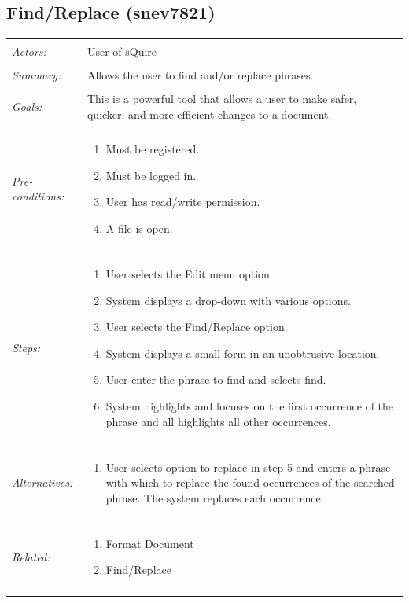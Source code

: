 \documentclass[11pt]{report}
\begin{document}
\subsection{Find/Replace  (snev7821)}
\begin{tabular}{ p{2cm} p{12cm} }
\hline
\\
	\textit{Actors:} & User of sQuire \\
	\\
	\textit{Summary:} &  Allows the user to find and/or replace phrases. \\
	\\
	\textit{Goals:} & This is a powerful tool that allows a user to make safer, quicker, and more efficient changes to a document. \\
	\\
	\textit{Pre-conditions:} &  \begin{enumerate}
		\item Must be registered.
		\item Must be logged in.
		\item User has read/write permission.
		\item A file is open.
	\end{enumerate}\\
	\\
	\textit{Steps:} & \begin{enumerate}
		\item User selects the Edit menu option.
		\item System displays a drop-down with various options.
		\item User selects the Find/Replace option.
		\item System displays a small form in an unobtrusive location.
		\item User enter the phrase to find and selects find.
		\item System highlights and focuses on the first occurrence of the phrase and all highlights all other occurrences.
	\end{enumerate} \\
	\\
	\textit{Alternatives:} & \begin{enumerate}
		\item User selects option to replace in step 5 and enters a phrase with which to replace the found occurrences of the searched phrase. The system replaces each occurrence.
	\end{enumerate} \\
	\\
	\textit{Related:} & \begin{enumerate}
		\item Format Document
		\item Find/Replace
	\end{enumerate} \\
	\\
\hline
\end{tabular}
\newpage
\end{document}
